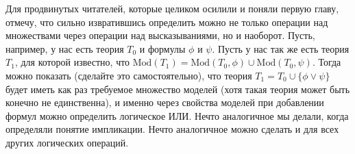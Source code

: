 Для продвинутых читателей, которые целиком осилили и поняли первую главу, отмечу, что сильно извратившись определить можно не только операции над множествами через операции над высказываниями, но и наоборот. Пусть, например, у нас есть теория $T_0$ и формулы $\phi$ и $\psi$. Пусть у нас так же есть теория $T_1$, для которой известно, что $\mathrm{Mod}(T_1) = \mathrm{Mod}(T_0, \phi) \cup \mathrm{Mod}(T_0, \psi)$. Тогда можно показать (сделайте это самостоятельно), что теория $T_1 = T_0 \cup \{\phi\vee \psi\}$ будет иметь как раз требуемое множество моделей (хотя такая теория может быть конечно не единственна), и именно через свойства моделей при добавлении формул можно определить логическое ИЛИ. Нечто аналогичное мы делали, когда определяли понятие импликации. Нечто аналогичное можно сделать и для всех других логических операций.

